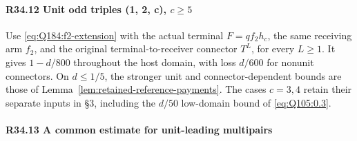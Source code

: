 \paragraph{R34.12 Unit odd triples (1, 2, c), \(c\ge5\)}
\label{part:R34:unit-two-triple}
Use \eqref{eq:Q184:f2-extension} with the actual terminal
\(F=qf_2h_c\), the same receiving arm \(f_2\), and the original
terminal-to-receiver connector \(T^L\), for every \(L\ge1\).
It gives \(1-d/800\) throughout the host domain, with loss \(d/600\)
for nonunit connectors. On \(d\le1/5\), the stronger unit and
connector-dependent bounds are those of
Lemma~\ref{lem:retained-reference-payments}.
The cases \(c=3,4\) retain their separate inputs in §3, including
the \(d/50\) low-domain bound of \eqref{eq:Q105:0.3}.

\paragraph{R34.13 A common estimate for unit-leading multipairs}
\label{part:R34:unit-multipair}

